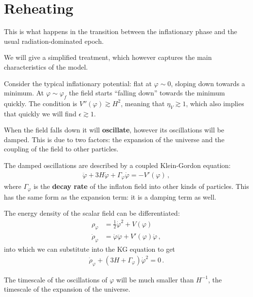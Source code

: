 \documentclass[main.tex]{subfiles}
\begin{document}
\section{Reheating}


This is what happens in the transition between the inflationary phase and the usual radiation-dominated epoch. 

We will give a simplified treatment, which however captures the main characteristics of the model.

Consider the typical inflationary potential: flat at \(\varphi \sim 0\), sloping down towards a minimum. At \(\varphi \sim \varphi _f\) the field starts ``falling down'' towards the minimum quickly.
The condition is \(V''(\varphi ) \gtrsim H^2\), meaning that \(\eta _V \gtrsim 1\), which also implies that quickly we will find \(\epsilon \gtrsim 1\). 

When the field falls down it will \textbf{oscillate}, however its oscillations will be damped.
This is due to two factors: the expansion of the universe and the coupling of the field to other particles. 

The damped oscillations are described by a coupled Klein-Gordon equation: 
%
\begin{align}
\ddot{\varphi} + 3 H \dot{\varphi} + \Gamma _\varphi \dot{\varphi} = - V' (\varphi )
\,,
\end{align}
%
where \(\Gamma _\varphi \) is the \textbf{decay rate} of the inflaton field into other kinds of particles. 
This has the same form as the expansion term: it is a damping term as well.

The energy density of the scalar field can be differentiated:
%
\begin{align}
\rho _\varphi &= \frac{1}{2} \dot{\varphi}^2 + V(\varphi )  \label{eq:scalar-field-energy-density}\\
\dot{\rho}_\varphi &= \dot{\varphi} \ddot{\varphi} + V' (\varphi ) \dot{\varphi}
\,,
\end{align}
%
into which we can substitute into the KG equation to get
%
\begin{align}
\dot{\rho}_\varphi + (3 H + \Gamma _\varphi ) \dot{\varphi}^2 = 0
\,.
\end{align}

The timescale of the oscillations of \(\varphi \) will be much smaller than \(H^{-1}\), the timescale of the expansion of the universe. 
\end{document}
